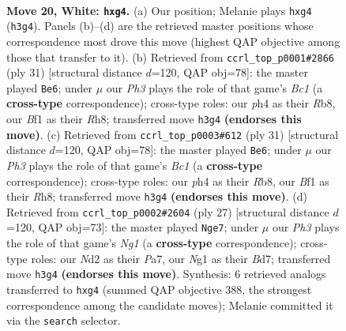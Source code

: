\documentclass[11pt]{article}
\begin{document}
\clearpage

\begin{figure}[p]\centering
\begin{subfigure}{0.46\textwidth}\centering
\resizebox{\linewidth}{!}{%
\newchessgame
\chessboard[
  setfen={r3k1nr/bpq5/4p3/p3Pp2/b1p2Qpp/P6P/RPnNKPP1/2B2BNR w kq - 0 20},
  showmover=false,
  pgfstyle=straightmove, color=movearrow, markmove={h3-g4}
]}
\caption{}
\end{subfigure}\hfill
\begin{subfigure}{0.46\textwidth}\centering
\resizebox{\linewidth}{!}{%
\newchessgame
\chessboard[
  setfen={1rb1k2r/4bpp1/p2p1n1p/q3p3/1p2P1PP/5P2/PPPQNB2/1K1R1B1R b k - 1 16},
  showmover=false,
  pgfstyle=straightmove, color=movearrow, markmove={c8-e6}
]}
\caption{}
\end{subfigure}
\\[4pt]
\begin{subfigure}{0.46\textwidth}\centering
\resizebox{\linewidth}{!}{%
\newchessgame
\chessboard[
  setfen={1rb1k2r/4bpp1/p2p1n1p/q3p3/1p2P1PP/5P2/PPPQNB2/1K1R1B1R b k - 1 16},
  showmover=false,
  pgfstyle=straightmove, color=movearrow, markmove={c8-e6}
]}
\caption{}
\end{subfigure}\hfill
\begin{subfigure}{0.46\textwidth}\centering
\resizebox{\linewidth}{!}{%
\newchessgame
\chessboard[
  setfen={2k2rnr/pp1b1pp1/2n1p2p/3pP2P/q1pP3N/P1P3P1/1QPB1P2/R3KB1R b KQ - 1 14},
  showmover=false,
  pgfstyle=straightmove, color=movearrow, markmove={g8-e7}
]}
\caption{}
\end{subfigure}
\caption{\textbf{Move 20, White: \texttt{hxg4}.} (a) Our position; Melanie plays \texttt{hxg4} (\texttt{h3g4}). Panels (b)--(d) are the retrieved master positions whose correspondence most drove this move (highest QAP objective among those that transfer to it). (b) Retrieved from \texttt{ccrl\_top\_p0001\#2866} (ply 31) [structural distance $d$=120, QAP obj=78]: the master played \texttt{Be6}; under $\mu$ our \emph{Ph3} plays the role of that game's \emph{Bc1} (a \textbf{cross-type} correspondence); cross-type roles: our \emph{p}h4 as their \emph{R}b8, our \emph{B}f1 as their \emph{R}h8; transferred move \texttt{h3g4} \textbf{(endorses this move)}. (c) Retrieved from \texttt{ccrl\_top\_p0003\#612} (ply 31) [structural distance $d$=120, QAP obj=78]: the master played \texttt{Be6}; under $\mu$ our \emph{Ph3} plays the role of that game's \emph{Bc1} (a \textbf{cross-type} correspondence); cross-type roles: our \emph{p}h4 as their \emph{R}b8, our \emph{B}f1 as their \emph{R}h8; transferred move \texttt{h3g4} \textbf{(endorses this move)}. (d) Retrieved from \texttt{ccrl\_top\_p0002\#2604} (ply 27) [structural distance $d$=120, QAP obj=73]: the master played \texttt{Nge7}; under $\mu$ our \emph{Ph3} plays the role of that game's \emph{Ng1} (a \textbf{cross-type} correspondence); cross-type roles: our \emph{N}d2 as their \emph{P}a7, our \emph{N}g1 as their \emph{B}d7; transferred move \texttt{h3g4} \textbf{(endorses this move)}. Synthesis: 6 retrieved analogs transferred to \texttt{hxg4} (summed QAP objective 388, the strongest correspondence among the candidate moves); Melanie committed it via the \texttt{search} selector.}

\end{figure}
\end{document}
